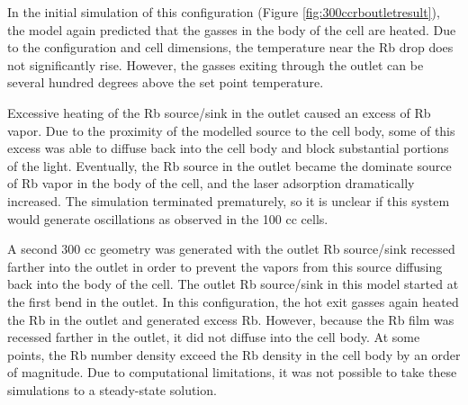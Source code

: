 In the initial simulation of this configuration (Figure \ref{fig:300ccrboutletresult}), the model again predicted that the gasses in the body of the cell are heated. Due to the configuration and cell dimensions, the temperature near the Rb drop does not significantly rise. However, the gasses exiting through the outlet can be several hundred degrees above the set point temperature.

Excessive heating of the Rb source/sink in the outlet caused an excess of Rb vapor. Due to the proximity of the modelled source to the cell body, some of this excess was able to diffuse back into the cell body and block substantial portions of the light. Eventually, the Rb source in the outlet became the dominate source of Rb vapor in the body of the cell, and the laser adsorption dramatically increased. The simulation terminated prematurely, so it is unclear if this system would generate oscillations as observed in the 100 cc cells.

A second 300 cc geometry was generated with the outlet Rb source/sink recessed farther into the outlet in order to prevent the vapors from this source diffusing back into the body of the cell. The outlet Rb source/sink in this model started at the first bend in the outlet. In this configuration, the hot exit gasses again heated the Rb in the outlet and generated excess Rb. However, because the Rb film was recessed farther in the outlet, it did not diffuse into the cell body. At some points, the Rb number density exceed the Rb density in the cell body by an order of magnitude. Due to computational limitations, it was not possible to take these simulations to a steady-state solution.


